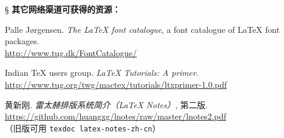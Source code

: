 \begin{thebibliography}{20}
\item[\S] {\bfseries 其它网络渠道可获得的资源：}

 Palle J{\o}rgensen.
  \newblock \emph{The \LaTeX{} font catalogue}, a font catalogue of \LaTeX{} font packages.\\
  \url{http://www.tug.dk/FontCatalogue/}

 Indian \TeX{} users group.
  \newblock \emph{\LaTeX{} Tutorials: A primer}. \\
  \url{http://www.tug.org/twg/mactex/tutorials/ltxprimer-1.0.pdf}

 黄新刚.
  \newblock \emph{雷太赫排版系统简介（\LaTeX{} Notes）}, 第二版. \\
  \url{https://github.com/huangxg/lnotes/raw/master/lnotes2.pdf} \\
  （旧版可用 \texttt{texdoc latex-notes-zh-cn}）

\end{thebibliography}

\endinput
